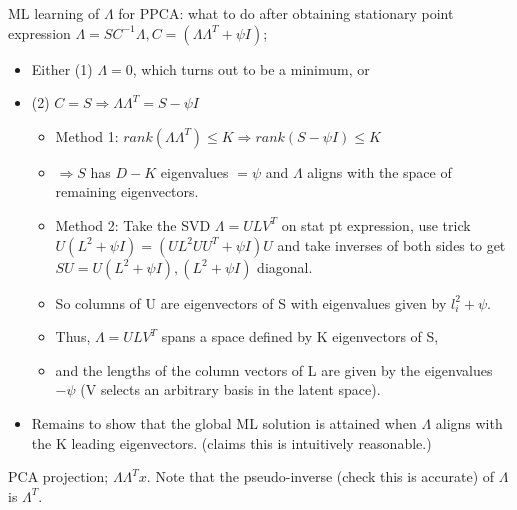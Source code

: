 \documentclass{article}
\begin{document}
ML learning of $\Lambda$ for PPCA: what to do after obtaining stationary point expression $\Lambda = SC^{-1}\Lambda, C=(\Lambda\Lambda^T+\psi I)$; \begin{itemize} \item Either (1) $\Lambda=0$, which turns out to be a minimum, or \item (2) $C=S \Rightarrow \Lambda\Lambda^T=S-\psi I$ \begin{itemize} \item Method 1: $rank(\Lambda\Lambda^T)\leq K\Rightarrow rank(S-\psi I) \leq K$ \item $\Rightarrow S$ has $D-K$ eigenvalues $=\psi$ and $\Lambda$ aligns with the space of remaining eigenvectors.  \item Method 2: Take the SVD $\Lambda = ULV^T$ on stat pt expression, use trick $U(L^2+\psi I)=(UL^2UU^T+\psi I)U$ and take inverses of both sides to get $SU=U(L^2+\psi I), (L^2+\psi I)$ diagonal.  \item So columns of U are eigenvectors of S with eigenvalues given by $l^2_i + \psi$.  \item Thus, $\Lambda = ULV^T$ spans a space defined by K eigenvectors of S, \item and the lengths of the column vectors of L are given by the eigenvalues $-\psi$ (V selects an arbitrary basis in the latent space).  \end{itemize} \item Remains to show that the global ML solution is attained when $\Lambda$ aligns with the K leading eigenvectors. (claims this is intuitively reasonable.) \end{itemize}

PCA projection; $\Lambda\Lambda^Tx$. Note that the pseudo-inverse (check this is accurate) of $\Lambda$ is $\Lambda^T$.
\end{document}
